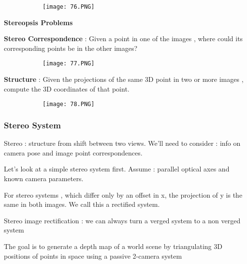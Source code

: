 \documentclass{article}
\begin{document}
\begin{figure}[ht!]
  \centering
  \begin{subfigure}[b]{0.4\linewidth}
    \texttt{[image: 76.PNG]}
  \end{subfigure}
\end{figure}

\vspace{50mm}

\textbf{Stereopsis Problems}

\vspace{3mm}

\textbf{Stereo Correspondence} : Given a point in one of the images , where could its corresponding points be in the other images?

\begin{figure}[ht!]
  \centering
  \begin{subfigure}[b]{0.2\linewidth}
    \texttt{[image: 77.PNG]}
  \end{subfigure}
\end{figure}

\textbf{Structure} : Given the projections of the same 3D point in two or more images , compute the 3D coordinates of that point.

\begin{figure}[ht!]
  \centering
  \begin{subfigure}[b]{0.2\linewidth}
    \texttt{[image: 78.PNG]}
  \end{subfigure}
\end{figure}

\subsubsection{Stereo System}
Stereo : structure from shift between two views.
We'll need to consider : info on camera pose and image point correspondences.

Let's look at a simple stereo system first.
Assume : parallel optical axes and known camera parameters.

For stereo systems , which differ only by an offset in x, the projection of y is the same in both images. We call this a rectified system.

Stereo image rectification : we can always turn a verged system to a non verged system

The goal is to generate a depth map of a world scene by triangulating 3D positions of points in space using a passive 2-camera system
\end{document}
